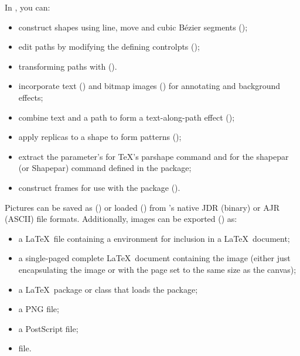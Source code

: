 In \FlowframTk, you can:

\begin{itemize}
  \item construct shapes using line, move and cubic Bézier segments
();

  \item edit paths by modifying the defining \glspl{controlpt}
  ();

  \item transforming paths with  ().

  \item incorporate text () and 
  bitmap images ()
  for annotating and background effects;

  \item combine text and a path to form a text-along-path
  effect ();

  \item apply replicas to a shape to form patterns
  ();

  \item extract the parameter's for \TeX's \gls{parshape} command and for 
  the \gls{shapepar} (or \gls{Shapepar}) command defined in the
   package;

  \item construct frames for use with the  package
  ().
\end{itemize}

Pictures can be saved as () or loaded
() from \FlowframTk's native \gls{JDR}
(binary) or \gls{AJR} (ASCII) file formats. Additionally, images can be
exported () as:

\begin{itemize}
    \item a \LaTeX\ file containing a  environment
    for inclusion in a \LaTeX\ document;

    \item a single-paged complete \LaTeX\ document containing the image
    (either just encapsulating the image or with the page set to the
    same size as the \gls{canvas});

    \item a \LaTeX\ package or class that loads the  package;

    \item a PNG file;

    \item a PostScript file;

    \item {} file.
\end{itemize}

